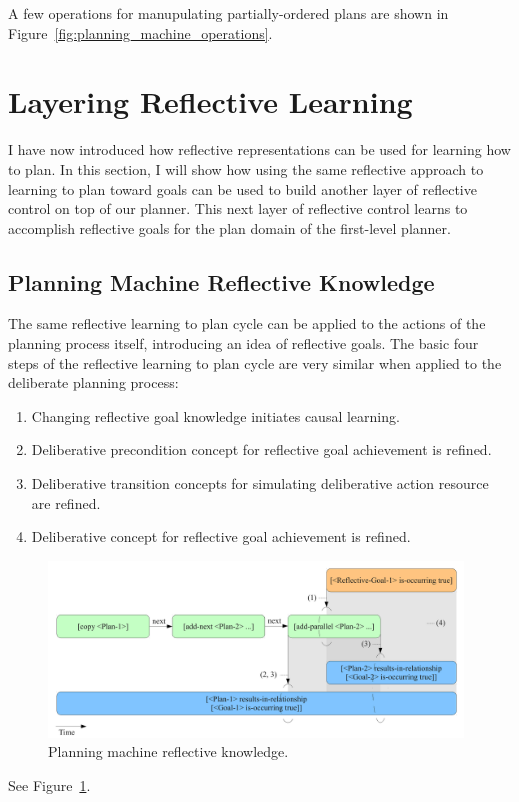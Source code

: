 A few operations for manupulating partially-ordered plans are shown in
Figure~\ref{fig:planning_machine_operations}.


\section{Layering Reflective Learning}

I have now introduced how reflective representations can be used for
learning how to plan.  In this section, I will show how using the same
reflective approach to learning to plan toward goals can be used to
build another layer of reflective control on top of our planner.  This
next layer of reflective control learns to accomplish reflective goals
for the plan domain of the first-level planner.

\subsection{Planning Machine Reflective Knowledge}

The same reflective learning to plan cycle can be applied to the
actions of the planning process itself, introducing an idea of
reflective goals.  The basic four steps of the reflective learning to
plan cycle are very similar when applied to the deliberate planning
process:

\begin{enumerate}
\item{Changing reflective goal knowledge initiates causal learning.}
\item{Deliberative precondition concept for reflective goal achievement is refined.}
\item{Deliberative transition concepts for simulating deliberative action resource are refined.}
\item{Deliberative concept for reflective goal achievement is refined.}
\end{enumerate}

\begin{figure}[bth]
  \center
  \includegraphics[width=11cm]{gfx/planning_machine_reflective_knowledge}
  \caption[Planning machine reflective knowledge]{Planning machine reflective knowledge.}
  \label{fig:planning_machine_reflective_knowledge}
\end{figure}

See Figure~\ref{fig:planning_machine_reflective_knowledge}.



